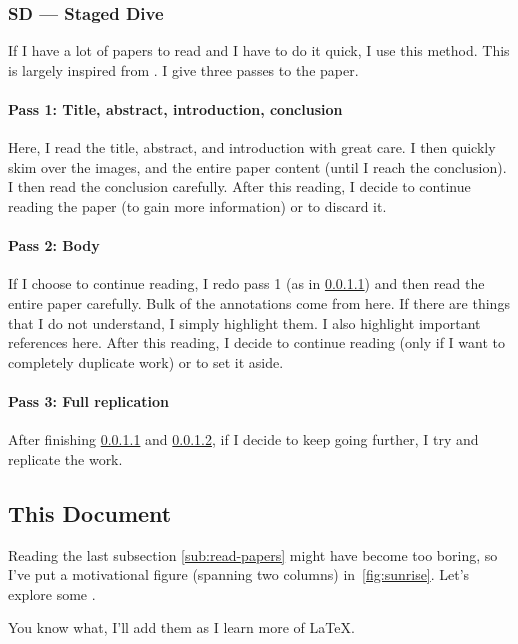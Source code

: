 \subsubsection{SD --- Staged Dive}

If I have a lot of papers to read and I have to do it quick, I use this method. This is largely inspired from \cite{keshav2007read}. I give three passes to the paper.

\paragraph{Pass 1: Title, abstract, introduction, conclusion}
\label{subsubpara:sd-pass1}

Here, I read the title, abstract, and introduction with great care. I then quickly skim over the images, and the entire paper content (until I reach the conclusion). I then read the conclusion carefully.
After this reading, I decide to continue reading the paper (to gain more information) or to discard it.

\paragraph{Pass 2: Body}
\label{subsubpara:sd-pass2}

If I choose to continue reading, I redo pass 1 (as in \ref{subsubpara:sd-pass1}) and then read the entire paper carefully. Bulk of the annotations come from here. If there are things that I do not understand, I simply highlight them. I also highlight important references here.
After this reading, I decide to continue reading (only if I want to completely duplicate work) or to set it aside.

\paragraph{Pass 3: Full replication}

After finishing \ref{subsubpara:sd-pass1} and \ref{subsubpara:sd-pass2}, if I decide to keep going further, I try and replicate the work.


\subsection{This Document}

Reading the last subsection \ref{sub:read-papers} might have become too boring, so I've put a motivational figure (spanning two columns) in~\autoref{fig:sunrise}. Let's explore some .

You know what, I'll add them as I learn more of \LaTeX.
